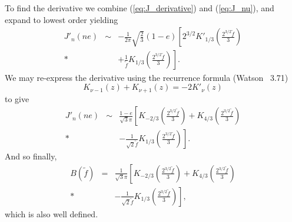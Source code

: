 \documentclass[aps,prd,amsfonts,amssymb,amsmath,nofootinbib,floatfix,reprint,showpacs,groupedaddress]{revtex4-1}
\newcommand{\eqnref}[1]{(\ref{eq:#1})}
\newcommand{\recip}[1]{\ensuremath{\frac{1}{#1}}}
\begin{document}
To find the derivative we combine \eqnref{J_derivative} and \eqnref{J_nu}, and expand to lowest order yielding
\begin{eqnarray}
J'_n(ne) & \sim & -\frac{1}{2\pi}\sqrt{\frac{2}{3}}(1-e)\left[2^{3/2}K'_{1/3}\left(\frac{2^{3/2}\tilde{f}}{3}\right) \right. \nonumber \\*
 & & \left. + \recip{\tilde{f}}K_{1/3}\left(\frac{2^{3/2}\tilde{f}}{3}\right)\right].
\end{eqnarray}
We may re-express the derivative using the recurrence formula (Watson~\cite{Watson1995} 3.71)
\begin{equation}
K_{\nu-1}(z) + K_{\nu+1}(z) = -2K'_\nu(z)
\end{equation}
to give
\begin{eqnarray}
J'_n(ne) & \sim & \frac{1-e}{\sqrt{3}\pi}\left[K_{-2/3}\left(\frac{2^{3/2}\tilde{f}}{3}\right) + K_{4/3}\left(\frac{2^{3/2}\tilde{f}}{3}\right) \right. \nonumber \\*
 & & \left. - \recip{\sqrt{2}\tilde{f}}K_{1/3}\left(\frac{2^{3/2}\tilde{f}}{3}\right)\right].
\end{eqnarray}
And so finally,
\begin{eqnarray}
B(\tilde{f}) & = & \recip{\sqrt{3}\pi}\left[K_{-2/3}\left(\frac{2^{3/2}\tilde{f}}{3}\right) + K_{4/3}\left(\frac{2^{3/2}\tilde{f}}{3}\right) \right. \nonumber \\*
 & & \left. - \recip{\sqrt{2}\tilde{f}}K_{1/3}\left(\frac{2^{3/2}\tilde{f}}{3}\right)\right],
\end{eqnarray}
which is also well defined.
\end{document}
